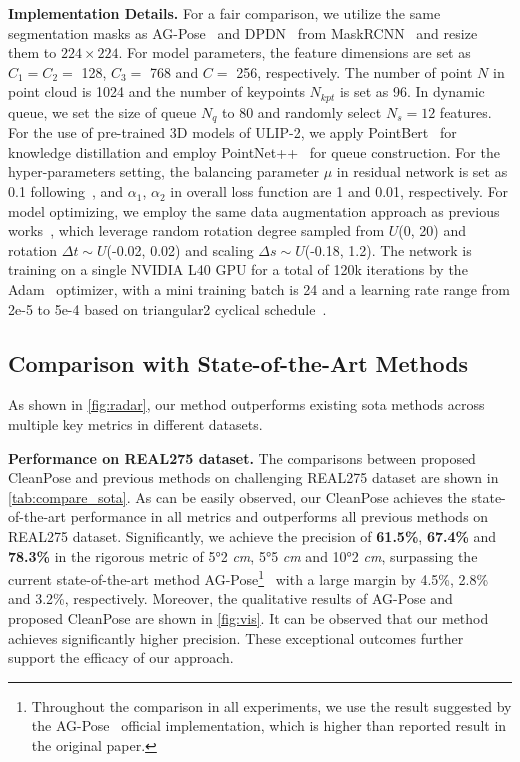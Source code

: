 \noindent
{\bf Implementation Details.} 
For a fair comparison, we utilize the same segmentation masks as AG-Pose~\cite{lin2024instance} and DPDN~\cite{lin2022category} from MaskRCNN~\cite{he2017mask} and resize them to $224 \times 224$. 
For model parameters, the feature dimensions are set as $C_1 = C_2 =$ 128, $C_3 =$ 768 and $C =$ 256, respectively. The number of point $N$ in point cloud is 1024 and the number of keypoints $N_{kpt}$ is set as 96. In dynamic queue, we set the size of queue $N_q$ to 80 and randomly select $N_{s} = 12$ features. 
For the use of pre-trained 3D models of ULIP-2, we apply PointBert~\cite{yu2022point} for knowledge distillation and employ PointNet++~\cite{qi2017pointnet++} for queue construction.
For the hyper-parameters setting, the balancing parameter $\mu$ in residual network is set as 0.1 following~\cite{huang2024froster}, and $\alpha_1$, $\alpha_2$ in overall loss function are 1 and 0.01, respectively.
For model optimizing, we employ the same data augmentation approach as previous works~\cite{lin2024instance,lin2022category}, which leverage random rotation degree sampled from $U$(0, 20) and rotation $\Delta t \sim U$(-0.02, 0.02) and scaling $\Delta s \sim U$(-0.18, 1.2).
The network is training on a single NVIDIA L40 GPU for a total of 120k iterations by the Adam~\cite{kingma2014adam} optimizer, with a mini training batch is 24 and a learning rate range from 2e-5 to 5e-4 based on triangular2 cyclical schedule~\cite{smith2017cyclical}.

\subsection{Comparison with State-of-the-Art Methods}
\label{sec:compare_sota}
As shown in \cref{fig:radar}, our method outperforms existing sota methods across multiple key metrics in different datasets.

\noindent
{\bf Performance on REAL275 dataset.}
The comparisons between proposed CleanPose and previous methods on challenging REAL275 dataset are shown in \cref{tab:compare_sota}.
As can be easily observed, our CleanPose achieves the state-of-the-art performance in all metrics and outperforms all previous methods on REAL275 dataset.
Significantly, we achieve the precision of \textbf{61.5\%}, \textbf{67.4\%} and \textbf{78.3\%} in the rigorous metric of 5°2 \emph{cm}, 5°5 \emph{cm} and 10°2 \emph{cm}, surpassing the current state-of-the-art method AG-Pose\footnote{Throughout the comparison in all experiments, we use the result suggested by the AG-Pose~\cite{lin2024instance} official implementation, which is higher than reported result in the original paper.}~\cite{lin2024instance} with a large margin by 4.5\%, 2.8\% and 3.2\%, respectively.
Moreover, the qualitative results of AG-Pose and proposed CleanPose are shown in \cref{fig:vis}. It can be observed that our method achieves significantly higher precision.
These exceptional outcomes further support the efficacy of our approach.


